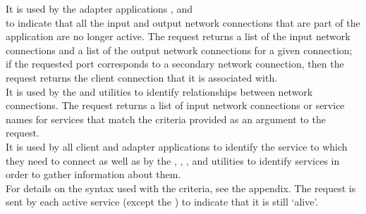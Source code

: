 It is used by the adapter applications ,
 and\\
 to indicate that all the input and
output \yarp{} network connections that are part of the application are no longer active.
The  request returns
a list of the input \yarp{} network connections and a list of the output \yarp{} network
connections for a given connection; if the requested port corresponds to a secondary
\yarp{} network connection, then the request returns the client connection that it is
associated with.\\

It is used by the  and
 utilities to identify relationships
between \yarp{} network connections.
The  request returns a list of
input \yarp{} network connections or service names for services that match the criteria
provided as an argument to the request.\\

It is used by all client and adapter applications to identify the service to which they
need to connect as well as by the ,
, ,
 and 
utilities to identify services in order to gather information about them.\\

For details on the syntax used with the criteria, see the 
 appendix.
The  request is sent by each
active service (except the ) to indicate
that it is still `alive'.\\


